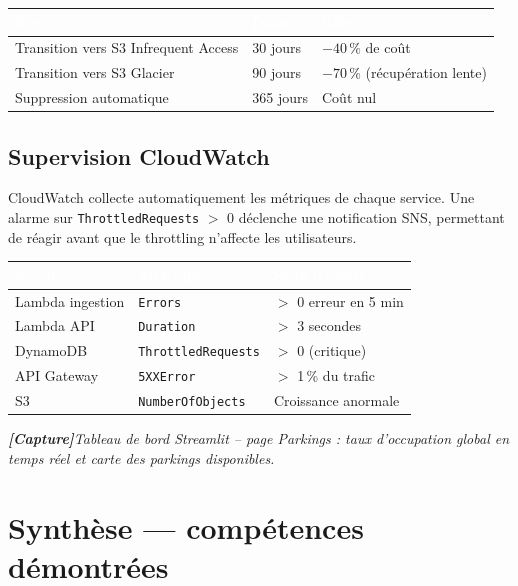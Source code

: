 \documentclass[11pt]{article}
\newcommand{\thead}[1]{\textbf{\textcolor{white}{#1}}}
\newcommand{\capture}[1]{%
  \begin{mdframed}[style=captureStyle]
    \centering\small\textit{\textbf{\textcolor{black!60}{[Capture]}}\quad #1}
  \end{mdframed}%
}
\begin{document}
\begin{center}\begin{tabularx}{\linewidth}{|>{\raggedright\arraybackslash}X|l|l|}
\hline
\rowcolor{tableHeader}
\thead{Règle} & \thead{Délai} & \thead{Effet} \\
\hline
Transition vers S3 Infrequent Access & 30 jours & $-40\,\%$ de coût \\
\hline
Transition vers S3 Glacier & 90 jours & $-70\,\%$ (récupération lente) \\
\hline
Suppression automatique & 365 jours & Coût nul \\
\hline
\end{tabularx}\end{center}

\subsection{Supervision CloudWatch}

CloudWatch collecte automatiquement les métriques de chaque service. Une alarme sur
\texttt{ThrottledRequests} $>$ 0 déclenche une notification SNS, permettant de réagir
avant que le throttling n'affecte les utilisateurs.

\begin{center}\begin{tabularx}{\linewidth}{|l|l|>{\raggedright\arraybackslash}X|}
\hline
\rowcolor{tableHeader}
\thead{Service} & \thead{Métrique} & \thead{Seuil d'alerte} \\
\hline
Lambda ingestion & \texttt{Errors} & $>$ 0 erreur en 5 min \\
\hline
Lambda API & \texttt{Duration} & $>$ 3 secondes \\
\hline
DynamoDB & \texttt{ThrottledRequests} & $>$ 0 (critique) \\
\hline
API Gateway & \texttt{5XXError} & $>$ 1\,\% du trafic \\
\hline
S3 & \texttt{NumberOfObjects} & Croissance anormale \\
\hline
\end{tabularx}\end{center}

\capture{Tableau de bord Streamlit -- page Parkings : taux d'occupation global en temps réel et carte des parkings disponibles.}

\section{Synthèse --- compétences démontrées}
\end{document}

